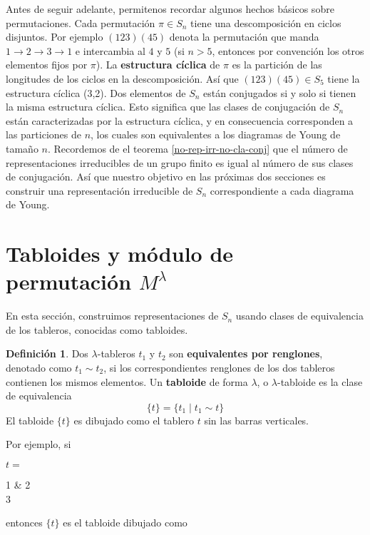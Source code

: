 \documentclass[12pt]{book}
\theoremstyle{definition}
\newtheorem{definition}[theorem]{Definición}
\newcounter{in}
\newcounter{ini}
\begin{document}
Antes de seguir adelante, permitenos recordar algunos hechos básicos
sobre permutaciones. Cada permutación $\pi \in S_{n}$ tiene una
descomposición en ciclos disjuntos. Por ejemplo $(123)(45)$ denota la
permutación que manda $1\rightarrow 2 \rightarrow 3 \rightarrow 1$  e
intercambia al $4$ y $5$ (si $n>5$, entonces por convención los otros
elementos fijos por $\pi$). La \textbf{estructura cíclica} de $\pi$ es la
partición de las longitudes de los ciclos en la
descomposición. Así que $(123)(45)\in S_{5}$ tiene la estructura
cíclica (3,2). Dos elementos de $S_{n}$ están conjugados si y solo si
tienen la misma estructura cíclica. %
Esto significa que las clases de conjugación de $S_{n}$ están
caracterizadas por la estructura cíclica, y en consecuencia
corresponden a las particiones de $n$, los cuales son equivalentes a
los diagramas de Young de tamaño $n$. Recordemos de el teorema
\ref{no-rep-irr-no-cla-conj} que el número de representaciones irreducibles de un
grupo finito es igual al número de sus clases de conjugación. Así que
nuestro objetivo en las próximas dos secciones es construir una
representación irreducible de $S_{n}$ correspondiente a cada diagrama
de Young.

\section{Tabloides y módulo de permutación $M^{\lambda}$}
\label{modulo-permutacion}

En esta sección, construimos representaciones de $S_{n}$ usando clases
de equivalencia de los tableros, conocidas como tabloides.

\begin{definition}
  Dos $\lambda$-tableros $t_{1}$ y $t_{2}$ son \textbf{equivalentes
    por renglones}, denotado como $t_{1}\sim t_{2}$, si los
  correspondientes renglones de los dos tableros contienen los mismos
  elementos. Un \textbf{tabloide} de forma $\lambda$, o
  $\lambda$-tabloide es la clase de equivalencia
  $$\{t\}=\{t_{1}\mid t_{1}\sim t\}$$
  El tabloide $\{t\}$ es dibujado como el tablero $t$ sin las barras
  verticales.
\end{definition}
Por ejemplo, si
\begin{center}
  $t=$
  \begin{ytableau}
    1 & 2  \\
    3
  \end{ytableau}
\end{center}
entonces $\{t\}$ es el tabloide dibujado como
\end{document}
